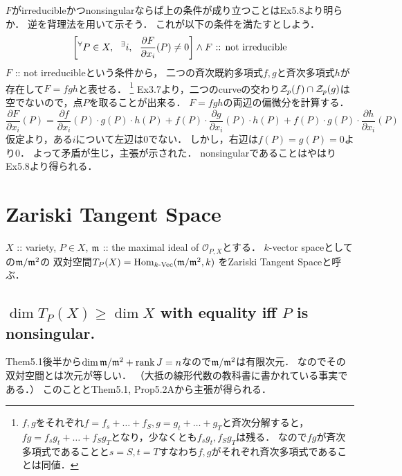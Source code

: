 \documentclass[a4paper]{jsarticle}
\begin{document}
    $F$がirreducibleかつnonsingularならば上の条件が成り立つことはEx5.8より明らか．
    逆を背理法を用いて示そう．
    これが以下の条件を満たすとしよう．
    \[ \left[{}^{\forall} P \in X,~~ {}^{\exists} i,~~ \frac{\partial F}{\partial x_i}(P) \neq 0 \right] \land F\text{ :: not irreducible} \]
    $F$ :: not irreducibleという条件から，
    二つの斉次既約多項式$f,g$と斉次多項式$h$が存在して$F=fgh$と表せる．
	\footnote
	{
		$f,g$をそれぞれ$f=f_s+\dots+f_S, g=g_t+\dots+g_T$と斉次分解すると，
		$fg=f_s g_t+\dots+f_S g_T$となり，少なくとも$f_s g_t, f_S g_T$は残る．
		なので$fg$が斉次多項式であることと$s=S, t=T$すなわち$f,g$がそれぞれ斉次多項式であることは同値．
	}
    Ex3.7より，二つのcurveの交わり$\mathcal{Z}_p(f) \cap \mathcal{Z}_p(g)$は空でないので，点$P$を取ることが出来る．
    $F=fgh$の両辺の偏微分を計算する．
    \[
        \frac{\partial F}{\partial x_i}(P)
        =
        \frac{\partial f}{\partial x_i}(P) \cdot g(P) \cdot h(P)
        +f(P) \cdot \frac{\partial g}{\partial x_i}(P) \cdot h(P)
        +f(P) \cdot g(P) \cdot \frac{\partial h}{\partial x_i}(P)
    \]
    仮定より，ある$i$について左辺は0でない．
    しかし，右辺は$f(P)=g(P)=0$より0．
    よって矛盾が生じ，主張が示された．
    nonsingularであることはやはりEx5.8より得られる．

\section{Zariski Tangent Space} %
    $X$ :: variety, $P \in X$, $\mathfrak{m}$ :: the maximal ideal of $\mathcal{O}_{P,X}$とする．
    $k$-vector spaceとしての$\mathfrak{m}/\mathfrak{m}^2$の
    双対空間$T_P(X)=\operatorname{Hom}_{\text{$k$-Vec}}(\mathfrak{m}/\mathfrak{m}^2, k)$
    をZariski Tangent Spaceと呼ぶ．

    \subsection{$\dim T_P(X) \geq \dim X$ with equality iff $P$ is nonsingular.}
    Them5.1後半から$\dim \mathfrak{m}/\mathfrak{m}^2+\operatorname{rank} J=n$なので$\mathfrak{m}/\mathfrak{m}^2$は有限次元．
    なのでその双対空間とは次元が等しい．
    （大抵の線形代数の教科書に書かれている事実である．）
    このこととThem5.1, Prop5.2Aから主張が得られる．
\end{document}

